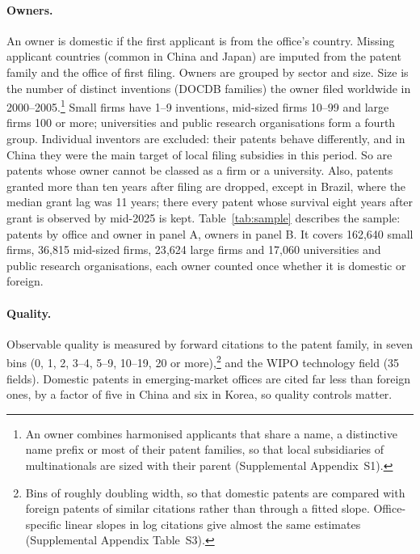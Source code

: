 \paragraph{Owners.} An owner is domestic if the first applicant is from the office's country. Missing applicant
countries (common in China and Japan) are imputed from the patent family and the office of first filing. Owners are
grouped by sector and size. Size is the number of distinct inventions (DOCDB families) the owner
filed worldwide in 2000--2005.\footnote{An owner combines harmonised applicants that share a name, a distinctive
name prefix or most of their patent families, so that local subsidiaries of multinationals are sized with their parent (Supplemental Appendix~S1).} Small firms have 1--9
inventions, mid-sized firms 10--99 and large firms 100 or more; universities and public research organisations form a
fourth group. Individual inventors are excluded: their patents behave differently, and in China they were the main
target of local filing subsidies in this period. So are patents whose owner cannot be classed as a firm or a
university. Also, patents granted more than ten years after filing are dropped, except in Brazil, where the median
grant lag was 11 years; there every patent whose survival eight years after grant is observed by mid-2025 is kept.
Table~\ref{tab:sample} describes the sample: patents by office and owner in panel A, owners in panel B. It covers
162{,}640 small firms, 36{,}815 mid-sized firms, 23{,}624 large firms and 17{,}060 universities and public research
organisations, each owner counted once whether it is domestic or foreign.





\paragraph{Quality.} Observable quality is measured by forward citations to the patent family, in seven bins (0, 1, 2,
3--4, 5--9, 10--19, 20 or more),\footnote{Bins of roughly doubling width, so that domestic patents
are compared with foreign patents of similar citations rather than through a fitted slope. Office-specific linear
slopes in log citations give almost the same estimates (Supplemental Appendix Table~S3).} and the WIPO technology field (35 fields). Domestic patents in emerging-market offices are cited far less than foreign
ones, by a factor of five in China and six in Korea, so quality controls matter.

